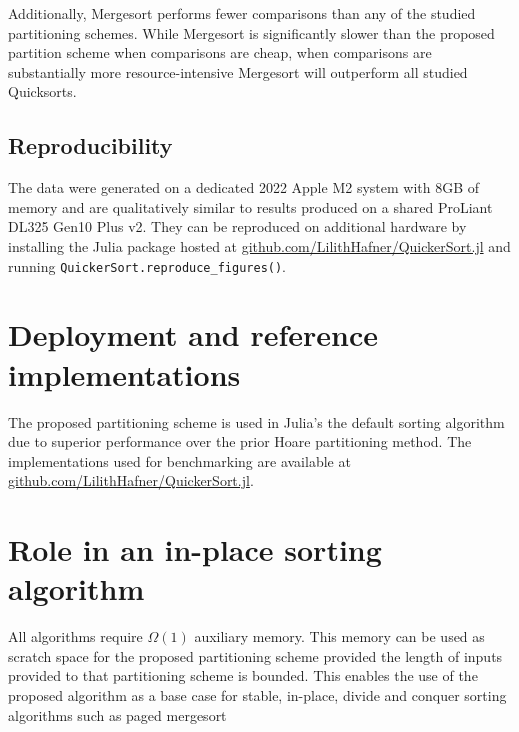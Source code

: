 \documentclass{juliacon}
\begin{document}
\vspace{8pt}

\scalebox{.5}{}

\vspace{5pt}

Additionally, Mergesort performs fewer comparisons than any of the studied partitioning schemes. While Mergesort is significantly slower than the proposed partition scheme when comparisons are cheap, when comparisons are substantially more resource-intensive Mergesort will outperform all studied Quicksorts. 

\subsection{Reproducibility}

The data were generated on a dedicated 2022 Apple M2 system with 8GB of memory and are qualitatively similar to results produced on a shared ProLiant DL325 Gen10 Plus v2. They can be reproduced on additional hardware by installing the Julia package hosted at \href{https://github.com/LilithHafner/QuickerSort.jl}{github.com/LilithHafner/QuickerSort.jl} and running \lstinline{QuickerSort.reproduce_figures()}.

\section{Deployment and reference implementations}

The proposed partitioning scheme is used in Julia's the default sorting algorithm due to superior performance over the prior Hoare partitioning method\cite{PR}. The implementations used for benchmarking are available at \href{https://github.com/LilithHafner/QuickerSort.jl}{github.com/LilithHafner/QuickerSort.jl}.

\section{Role in an in-place sorting algorithm}

All algorithms require $\Omega(1)$ auxiliary memory. This memory can be used as scratch space for the proposed partitioning scheme provided the length of inputs provided to that partitioning scheme is bounded. This enables the use of the proposed algorithm as a base case for stable, in-place, divide and conquer sorting algorithms such as paged mergesort \cite{pagedmergesort}



\end{document}
